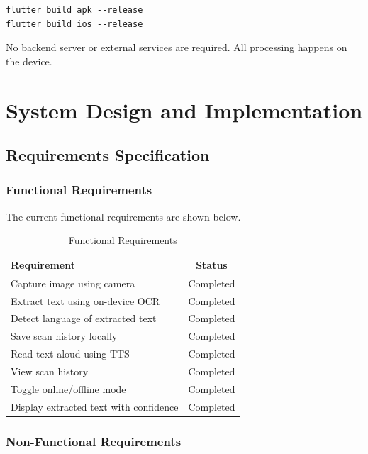 \documentclass[12pt,a4paper]{report}
\begin{document}
\begin{lstlisting}
flutter build apk --release
flutter build ios --release
\end{lstlisting}

No backend server or external services are required. All processing happens on the device.


\chapter{System Design and Implementation}

\section{Requirements Specification}

\subsection{Functional Requirements}

The current functional requirements are shown below.

\begin{table}[H]
\centering
\caption{Functional Requirements}
\begin{tabular}{|p{7cm}|c|}
\hline
\textbf{Requirement} & \textbf{Status} \\ \hline
Capture image using camera & Completed \\ \hline
Extract text using on-device OCR & Completed \\ \hline
Detect language of extracted text & Completed \\ \hline
Save scan history locally & Completed \\ \hline
Read text aloud using TTS & Completed \\ \hline
View scan history & Completed \\ \hline
Toggle online/offline mode & Completed \\ \hline
Display extracted text with confidence & Completed \\ \hline
\end{tabular}
\end{table}

\subsection{Non-Functional Requirements}
\end{document}
